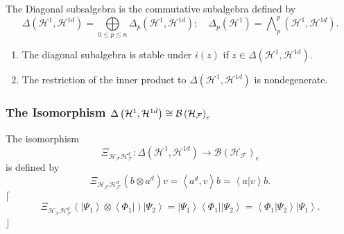 \documentclass[aps,preprint]{revtex4}%
\begin{document}
The Diagonal subsalgebra is the commutative subalgebra defined by
\begin{equation}
\Delta\left(  \mathcal{H}^{1},\mathcal{H}^{1d}\right)  =%
{\textstyle\bigoplus\limits_{0\leq p\leq n}}
\Delta_{p}\left(  \mathcal{H}^{1},\mathcal{H}^{1d}\right)  ;\quad\Delta
_{p}\left(  \mathcal{H}^{1}\right)  =%
{\textstyle\bigwedge\nolimits_{p}^{p}}
\left(  \mathcal{H}^{1},\mathcal{H}^{1d}\right)  .
\end{equation}


\begin{enumerate}
\item The diagonal subalgebra is stable under $i\left(  z\right)  $ if
$z\in\Delta\left(  \mathcal{H}^{1},\mathcal{H}^{1d}\right)  .$

\item The restriction of the inner product to $\Delta\left(  \mathcal{H}%
^{1},\mathcal{H}^{1d}\right)  $ is nondegenerate.
\end{enumerate}

\subsubsection{The Isomorphism $\Delta\left(  \mathcal{H}^{1},\mathcal{H}%
^{1d}\right)  \protect\cong\mathcal{B}\left(  \mathcal{H}_{\mathcal{F}%
}\right)  _{e}$}

The isomorphism
\begin{equation}
\Xi_{\mathcal{H}_{\mathcal{F}}\mathcal{H}_{\mathcal{F}}^{d}}:\Delta\left(
\mathcal{H}^{1},\mathcal{H}^{1d}\right)  \rightarrow\mathcal{B}\left(
\mathcal{H}_{\mathcal{F}}\right)  _{e}%
\end{equation}
is defined by
\begin{equation}
\Xi_{\mathcal{H}_{\mathcal{F}}\mathcal{H}_{\mathcal{F}}^{d}}\left(  b\otimes
a^{d}\right)  v=\left\langle a^{d},v\right\rangle b=\left\langle \left.
a\right\vert v\right\rangle b.
\end{equation}
$\lceil$%
\begin{equation}
\Xi_{\mathcal{H}_{\mathcal{F}}\mathcal{H}_{\mathcal{F}}^{d}}\left(  \left\vert
\Psi_{1}\right\rangle \otimes\left\langle \Phi_{1}\right\vert \right)
\left\vert \Psi_{2}\right\rangle =\left\vert \Psi_{1}\right\rangle
\left\langle \Phi_{1}\right\vert \left\vert \Psi_{2}\right\rangle
=\left\langle \left.  \Phi_{1}\right\vert \Psi_{2}\right\rangle \left\vert
\Psi_{1}\right\rangle .
\end{equation}
$\rfloor$
\end{document}
